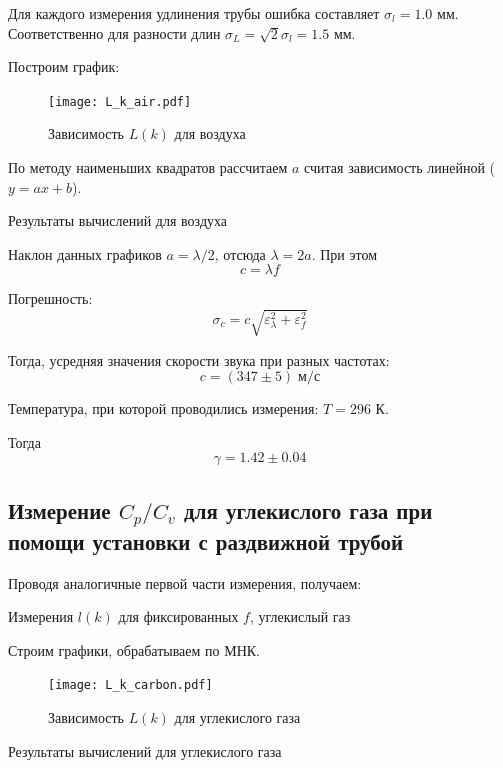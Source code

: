 \documentclass[12pt,a4paper]{article}
\begin{document}
		Для каждого измерения удлинения трубы ошибка составляет $\sigma_l = 1.0$ мм.
		Соответственно для разности длин $\sigma_L = \sqrt{2} \sigma_l = 1.5$ мм.
		
		Построим график:
		
		\begin{figure}[H]
			\texttt{[image: L\_k\_air.pdf]}
			\caption{Зависимость $L(k)$ для воздуха}
		\end{figure}
	
		По методу наименьших квадратов рассчитаем $a$ считая зависимость линейной ($y = ax + b$).
	
		\begin{table}[h]
			\caption{Результаты вычислений для воздуха}
			
		\end{table}
		
		Наклон данных графиков $a = \lambda/2$, отсюда $\lambda = 2a$.
		При этом 
			$$c = \lambda f$$
		
		Погрешность:
			$$\sigma_c = c \sqrt{\varepsilon_{\lambda}^2 + \varepsilon_{f}^2}$$
		
		Тогда, усредняя значения скорости звука при разных частотах:
			$$c = (347 \pm 5) \; \text{м/с}$$
			
		Температура, при которой проводились измерения: $T = 296$ К.
		
		Тогда
			$$\gamma = 1.42 \pm 0.04$$
		
\newpage

		\subsection*{Измерение $ C_p/C_v $ для углекислого газа при помощи установки с раздвижной трубой}
		
		Проводя аналогичные первой части измерения, получаем:
		
		\begin{table}[H]
			\caption{Измерения $l(k)$ для фиксированных $f$, углекислый газ}
			
		\end{table}
		
		Строим графики, обрабатываем по МНК.
		
		\begin{figure}[H]
			\texttt{[image: L\_k\_carbon.pdf]}
			\caption{Зависимость $L(k)$ для углекислого газа}
		\end{figure}
		
		\begin{table}[H]
			\caption{Результаты вычислений для углекислого газа}
			
		\end{table}
		
\end{document}
